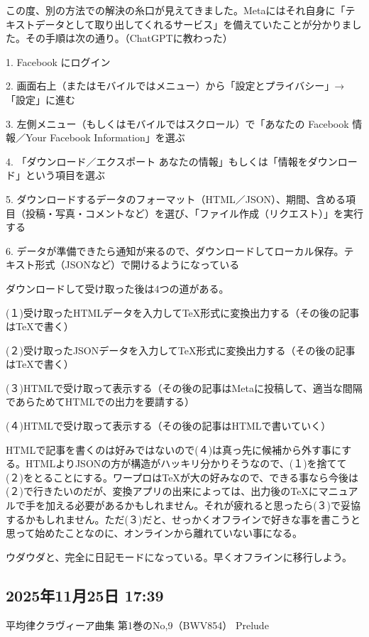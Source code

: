 \documentclass[facebook_diary.tex]{subfiles}
\begin{document}
この度、別の方法での解決の糸口が見えてきました。Metaにはそれ自身に「テキストデータとして取り出してくれるサービス」を備えていたことが分かりました。その手順は次の通り。（ChatGPTに教わった）


1. Facebook にログイン

2. 画面右上（またはモバイルではメニュー）から「設定とプライバシー」→「設定」に進む

3. 左側メニュー（もしくはモバイルではスクロール）で「あなたの Facebook 情報／Your Facebook Information」を選ぶ

4. 「ダウンロード／エクスポート あなたの情報」もしくは「情報をダウンロード」という項目を選ぶ

5. ダウンロードするデータのフォーマット（HTML／JSON）、期間、含める項目（投稿・写真・コメントなど）を選び、「ファイル作成（リクエスト）」を実行する

6. データが準備できたら通知が来るので、ダウンロードしてローカル保存。テキスト形式（JSONなど）で開けるようになっている


ダウンロードして受け取った後は4つの道がある。

(１)受け取ったHTMLデータを入力してTeX形式に変換出力する（その後の記事はTeXで書く）

(２)受け取ったJSONデータを入力してTeX形式に変換出力する（その後の記事はTeXで書く）

(３)HTMLで受け取って表示する（その後の記事はMetaに投稿して、適当な間隔であらためてHTMLでの出力を要請する）

(４)HTMLで受け取って表示する（その後の記事はHTMLで書いていく）


HTMLで記事を書くのは好みではないので(４)は真っ先に候補から外す事にする。HTMLよりJSONの方が構造がハッキリ分かりそうなので、(１)を捨てて(２)をとることにする。ワープロはTeXが大の好みなので、できる事なら今後は(２)で行きたいのだが、変換アプリの出来によっては、出力後のTeXにマニュアルで手を加える必要があるかもしれません。それが疲れると思ったら(３)で妥協するかもしれません。ただ(３)だと、せっかくオフラインで好きな事を書こうと思って始めたことなのに、オンラインから離れていない事になる。


ウダウダと、完全に日記モードになっている。早くオフラインに移行しよう。

\subsection*{2025年11月25日 17:39}

平均律クラヴィーア曲集 第1巻のNo,9（BWV854） Prelude
\end{document}
